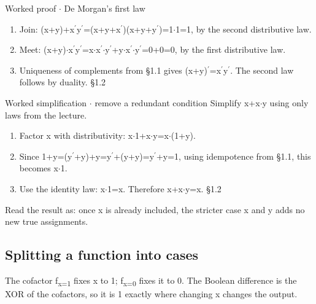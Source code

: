 \documentclass[11pt]{article}
\begin{document}
\begin{keepsection}
\begin{workedbox}{Worked proof \ensuremath{\cdot} De Morgan’s first law}
\begin{enumerate}
\item Join: (x+y)+x\ensuremath{{}^{\prime}}y\ensuremath{{}^{\prime}}=(x+y+x\ensuremath{{}^{\prime}})(x+y+y\ensuremath{{}^{\prime}})=1\ensuremath{\cdot}1=1, by the second distributive law.
\item Meet: (x+y)\ensuremath{\cdot}x\ensuremath{{}^{\prime}}y\ensuremath{{}^{\prime}}=x\ensuremath{\cdot}x\ensuremath{{}^{\prime}}\ensuremath{\cdot}y\ensuremath{{}^{\prime}}+y\ensuremath{\cdot}x\ensuremath{{}^{\prime}}\ensuremath{\cdot}y\ensuremath{{}^{\prime}}=0+0=0, by the first distributive law.
\item Uniqueness of complements from §1.1 gives (x+y)\ensuremath{{}^{\prime}}=x\ensuremath{{}^{\prime}}y\ensuremath{{}^{\prime}}. The second law follows by duality. \hfill{\small\color{FAUblue}§1.2}
\end{enumerate}
\end{workedbox}

\begin{workedbox}{Worked simplification \ensuremath{\cdot} remove a redundant condition}
Simplify x+x\ensuremath{\cdot}y using only laws from the lecture.

\begin{enumerate}
\item Factor x with distributivity: x\ensuremath{\cdot}1+x\ensuremath{\cdot}y=x\ensuremath{\cdot}(1+y).
\item Since 1+y=(y\ensuremath{{}^{\prime}}+y)+y=y\ensuremath{{}^{\prime}}+(y+y)=y\ensuremath{{}^{\prime}}+y=1, using idempotence from §1.1, this becomes x\ensuremath{\cdot}1.
\item Use the identity law: x\ensuremath{\cdot}1=x. Therefore x+x\ensuremath{\cdot}y=x. \hfill{\small\color{FAUblue}§1.2}
\end{enumerate}

Read the result as: once x is already included, the stricter case x and y adds no new true assignments.
\end{workedbox}

\begin{keepsection}
\subsection{Splitting a function into cases}

The cofactor f\textsubscript{x=1} fixes x to 1; f\textsubscript{x=0} fixes it to 0. The Boolean difference is the XOR of the cofactors, so it is 1 exactly where changing x changes the output.


\end{keepsection}
\end{keepsection}
\end{document}
